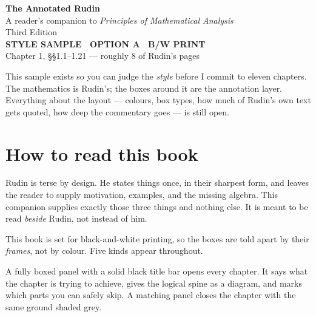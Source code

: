 \documentclass[11pt,twoside]{article}
\begin{document}
\thispagestyle{empty}
\vspace*{1.6in}
\begin{center}
{\sffamily\Huge\bfseries\color{RuInk} The Annotated Rudin}\\[10pt]
{\sffamily\large\color{RuGrey} A reader's companion to \emph{Principles of Mathematical Analysis}}\\[4pt]
{\sffamily\large\color{RuGrey} Third Edition}\\[40pt]
{\sffamily\normalsize\color{RuInk}\bfseries STYLE SAMPLE \textperiodcentered\ OPTION A \textperiodcentered\ B/W PRINT}\\[6pt]
{\sffamily\small\color{RuGrey} Chapter 1, \S\S1.1--1.21 --- roughly 8 of Rudin's pages}
\end{center}
\vfill
\begin{center}
\begin{minipage}{0.82\textwidth}
\small\color{RuGrey}
This sample exists so you can judge the \emph{style} before I commit to eleven
chapters. The mathematics is Rudin's; the boxes around it are the annotation
layer. Everything about the layout --- colours, box types, how much of Rudin's
own text gets quoted, how deep the commentary goes --- is still open.
\end{minipage}
\end{center}
\newpage

\section*{How to read this book}

Rudin is terse by design. He states things once, in their sharpest form, and
leaves the reader to supply motivation, examples, and the missing algebra. This
companion supplies exactly those three things and nothing else. It is meant to
be read \emph{beside} Rudin, not instead of him.

This book is set for black-and-white printing, so the boxes are told apart by
their \emph{frames}, not by colour. Five kinds appear throughout.

\begin{roadmap}
A fully boxed panel with a solid black title bar opens every chapter. It says
what the chapter is trying to achieve, gives the logical spine as a diagram, and
marks which parts you can safely skip. A matching panel closes the chapter with
the same ground shaded grey.
\end{roadmap}
\end{document}
